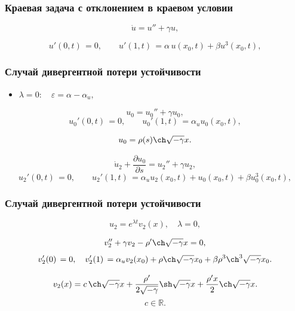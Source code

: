 \documentclass[fullscreen=true, unicode, bookmarks=false]{beamer}
\begin{document}
\begin{frame}
\frametitle{ Краевая задача с отклонением в краевом условии }
 
\begin{equation}
	\dot u = u'' + \gamma u,	
\end{equation}

\vfill

\begin{equation}
	u'(0, t) \, = 0, \qquad u'(1, t) \, = \alpha\,u(x_0, t) + \beta u^3(x_0, t),
\end{equation}

\end{frame}

\begin{frame}
\frametitle{ Случай дивергентной потери устойчивости }

\begin{itemize}
\item { $ \lambda = 0: \quad \varepsilon=\alpha-\alpha_u, $
}
\end{itemize}

\medskip
\pause

\begin{equation}
	u_0 = u_0'' + \gamma u_0,
\end{equation}
\begin{equation}
	u_0'(0, t) \, = 0, \qquad u_0'(1, t) \, = \alpha_u u_0(x_0, t),
\end{equation}

$$ u_0 = \rho(s) \ch \sqrt{-\gamma} x. $$

\medskip

\begin{equation}
	\dot u_2 + \frac{\partial u_0}{\partial s} = u_2'' + \gamma u_2,
\end{equation}
\begin{equation}
	u_2'(0, t) \, = 0, \qquad u_2'(1, t) \, = \alpha_u u_2(x_0, t) + u_0(x_0, t) + \beta u_0^3(x_0, t),
\end{equation}

\end{frame}

\begin{frame}
\frametitle{ Случай дивергентной потери устойчивости }

$$ u_2 = e^{\lambda t}v_2(x), \quad \lambda = 0, $$

\medskip
\pause

\begin{equation}
	v_2'' + \gamma v_2 - \rho' \ch \sqrt{-\gamma} x = 0,
\end{equation}
\begin{equation}
	v_2'(0) \, = 0, \quad v_2'(1) \, = \alpha_u v_2(x_0) + \rho \ch \sqrt{-\gamma} x_0 + \beta \rho^3\ch^3 \sqrt{-\gamma} x_0.
\end{equation}

\medskip
\pause

$$ v_2(x) = c\,\ch \sqrt{-\gamma} x + \frac{\rho'}{2\sqrt{-\gamma}}\sh\sqrt{-\gamma}x + \frac{\rho'x}{2} \ch\sqrt{-\gamma}x. $$
$$ c \in \mathbb{R}. $$

\end{frame}
\end{document}
